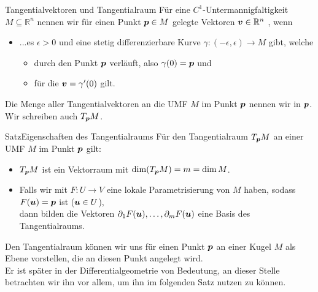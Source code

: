 \begin{Def}
{Tangentialvektoren und Tangentialraum}
Für eine $C^1$-Untermannigfaltigkeit $M\subseteq\mathbb{R}^n$ nennen wir für einen Punkt ${{\text{\boldmath${p}$}}}\in M$ gelegte Vektoren ${{\text{\boldmath${v}$}}}\in\mathbb{R}^n$ , wenn
\begin{itemize}
    \item ...es $\epsilon>0$ und eine stetig differenzierbare Kurve $\gamma:(-\epsilon,\epsilon)\to M$ gibt, welche
    \begin{itemize}
        \item durch den Punkt ${{\text{\boldmath${p}$}}}$ verläuft, also $\gamma(0)={{\text{\boldmath${p}$}}}$ und
        \item für die ${{\text{\boldmath${v}$}}}=\gamma'(0)$ gilt.
    \end{itemize}
\end{itemize}
Die Menge aller Tangentialvektoren an die UMF $M$ im Punkt ${{\text{\boldmath${p}$}}}$ nennen wir  in ${{\text{\boldmath${p}$}}}$.\\
Wir schreiben auch $T_{{\text{\boldmath${p}$}}} M$.
\end{Def}
\begin{Satz}
{Satz}{Eigenschaften des Tangentialraums}
Für den Tangentialraum $T_{{\text{\boldmath${p}$}}} M$ an einer UMF $M$ im Punkt ${{\text{\boldmath${p}$}}}$ gilt:
\begin{itemize}
    \item $T_{{\text{\boldmath${p}$}}} M$ ist ein Vektorraum mit $\dim (T_{{\text{\boldmath${p}$}}} M)=m=\dim M$.
    \item Falls wir mit $F:U\to V$ eine lokale Parametrisierung von $M$ haben, sodass $F({{\text{\boldmath${u}$}}})={{\text{\boldmath${p}$}}}$ ist (${{\text{\boldmath${u}$}}}\in U$),\\
    dann bilden die Vektoren $\partial_1F({{\text{\boldmath${u}$}}}),\ldots,\partial_mF({{\text{\boldmath${u}$}}})$ eine Basis des Tangentialraums.
\end{itemize}
\end{Satz}
Den Tangentialraum können wir uns für einen Punkt ${{\text{\boldmath${p}$}}}$ an einer Kugel $M$ als Ebene vorstellen, die an diesen Punkt angelegt wird.\\
Er ist später in der Differentialgeometrie von Bedeutung, an dieser Stelle betrachten wir ihn vor allem, um ihn im folgenden Satz nutzen zu können.

